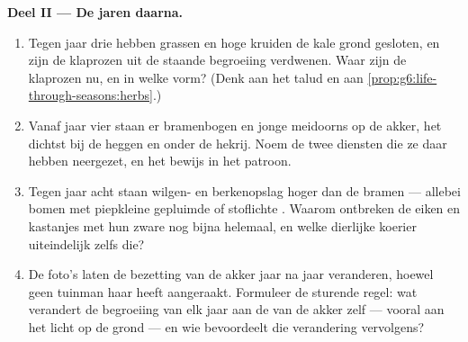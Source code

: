 \begin{problem}
\medskip\noindent\textbf{Deel II --- De jaren daarna.}
\begin{enumerate}[resume]
  \item Tegen jaar drie hebben grassen en hoge kruiden de kale grond
        gesloten, en zijn de klaprozen uit de staande begroeiing
        verdwenen. Waar zijn de klaprozen nu, en in welke vorm? (Denk aan
        het talud en aan \cref{prop:g6:life-through-seasons:herbs}.)
  \item Vanaf jaar vier staan er bramenbogen en jonge meidoorns op de
        akker, het dichtst bij de heggen en onder de hekrij. Noem de twee
        diensten die ze daar hebben neergezet, en het bewijs in het
        patroon.
  \item Tegen jaar acht staan wilgen- en berkenopslag hoger dan de
        bramen --- allebei bomen met piepkleine gepluimde of stoflichte
        . Waarom ontbreken de eiken en kastanjes met hun zware 
        nog bijna helemaal, en welke dierlijke koerier  uiteindelijk
        zelfs die?
  \item De foto's laten de bezetting van de akker jaar na jaar
        veranderen, hoewel geen tuinman haar heeft aangeraakt. Formuleer
        de sturende regel: wat verandert de begroeiing van elk jaar aan
        de  van de akker zelf --- vooral aan het licht op
        de grond --- en wie bevoordeelt die verandering vervolgens?
\end{enumerate}


\end{problem}
